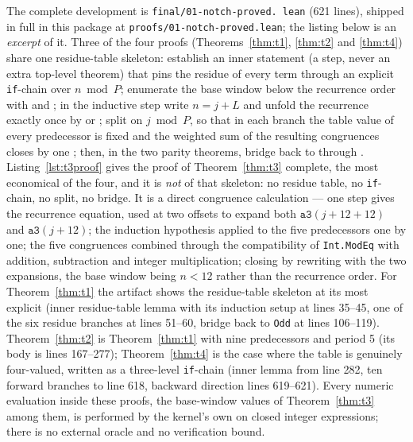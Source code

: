 \documentclass[11pt]{article}
\begin{document}
The complete development is \texttt{final/}\allowbreak\texttt{01-notch-proved.%
lean} (621 lines), shipped in full in this package at
\texttt{proofs/01-notch-proved.lean}; the listing below is an \emph{excerpt} of
it. Three of the four proofs (Theorems~\ref{thm:t1}, \ref{thm:t2} and
\ref{thm:t4}) share one residue-table skeleton: establish an inner statement (a
 step, never an extra top-level theorem) that pins the residue of
every term through an explicit \texttt{if}-chain over $n \bmod P$; enumerate the
base window below the recurrence order with  and
; in the inductive step write $n = j + L$ and unfold the recurrence
exactly once by  or ; split on
 $j \bmod P$, so that in each branch the table value of every
predecessor is fixed and the weighted sum of the resulting congruences closes by
one ; then, in the two parity theorems, bridge back to 
through . Listing~\ref{lst:t3proof} gives the proof of
Theorem~\ref{thm:t3} complete, the most economical of the four, and it is
\emph{not} of that skeleton: no residue table, no \texttt{if}-chain, no
 split, no  bridge. It is a direct congruence
calculation --- one  step gives the recurrence equation,
used at two offsets to expand both $\texttt{a3}(j+12+12)$ and
$\texttt{a3}(j+12)$; the induction hypothesis applied to the five predecessors
one by one; the five congruences combined through the compatibility of
\texttt{Int.ModEq} with addition, subtraction and integer multiplication;
closing by rewriting with the two expansions, the base window being $n<12$
rather than the recurrence order. For Theorem~\ref{thm:t1} the artifact
shows the residue-table skeleton at its most explicit (inner residue-table lemma
with its induction
setup at lines 35--45, one of the six residue branches at lines 51--60, bridge
back to \texttt{Odd} at lines 106--119). Theorem~\ref{thm:t2} is
Theorem~\ref{thm:t1} with nine predecessors and period 5 (its body is lines
167--277); Theorem~\ref{thm:t4} is the case where the table is genuinely
four-valued, written as a three-level \texttt{if}-chain (inner lemma from line
282, ten forward branches to line 618, backward direction lines 619--621). Every
numeric evaluation inside these proofs, the base-window values of
Theorem~\ref{thm:t3} among them, is performed by the kernel's own 
on closed integer expressions; there is no external oracle and no
verification bound.
\end{document}
